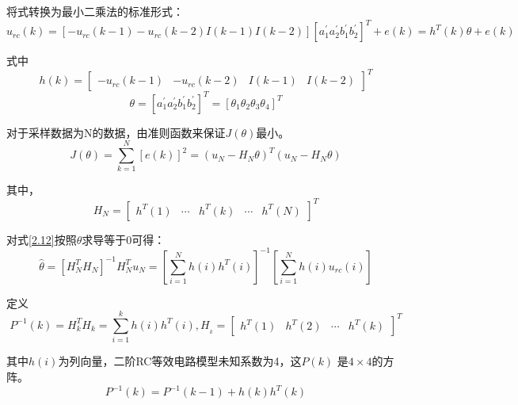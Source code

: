 将式\label{2.7}转换为最小二乘法的标准形式：
\begin{equation}
{{u}_{rc}}(k)=[-{{u}_{rc}}(k-1)-{{u}_{rc}}(k-2)I(k-1)I(k-2)]{{[a_{1}^{'}a_{2}^{'}b_{1}^{'}b_{2}^{'}]}^{T}}+e(k)={{h}^{T}}(k)\theta +e(k)
\end{equation}

式中
\begin{equation}
h(k) = {\left[ {\begin{array}{*{20}{c}}
{ - {u_{rc}}(k - 1)}&{ - {u_{rc}}(k - 2)}&{I(k - 1)}&{I(k - 2)}
\end{array}} \right]^T}
\end{equation}
\begin{equation}
\theta ={{\left[ a_{1}^{'}a_{2}^{'}b_{1}^{'}b_{2}^{'} \right]}^{T}}={{\left[ {{\theta }_{1}}{{\theta }_{2}}{{\theta }_{3}}{{\theta }_{4}} \right]}^{T}}
\end{equation}

对于采样数据为N的数据，由准则函数来保证$J\left( \theta  \right)$最小。
\begin{equation}\label{2.12}
J\left( \theta  \right) = \sum\limits_{k = 1}^N {\left[ {e(k)} \right]_{}^2}  = {\left( {{u_N} - {H_N}\theta } \right)^T}({u_N} - {H_N}\theta )
\end{equation}

其中，
\begin{equation}
{H_N} = {\left[ {\begin{array}{*{20}{c}}
{{h^T}(1)}& \cdots &{{h^T}(k)}& \cdots &{{h^T}(N)}
\end{array}} \right]^T}
\end{equation}

对式\ref{2.12}按照$\theta$求导等于0可得：
\begin{equation}
\widehat \theta  = {\left[ {H_N^T{H_N}} \right]^{ - 1}}H_N^T{u_N} = {\left[ {\sum\limits_{i = 1}^N {h(i){h^T}(i)} } \right]^{ - 1}}\left[ {\sum\limits_{i = 1}^N {h(i){u_{rc}}(i)} } \right]
\end{equation}

定义
\begin{equation}
{P^{ - 1}}(k) = H_k^T{H_k} = {\sum\limits_{i = 1}^k {h(i){h^T}(i),{H_{_k}} = \left[ {\begin{array}{*{20}{c}}
{{h^T}(1)}&{{h^T}(2)}& \cdots &{{h^T}(k)}
\end{array}} \right]} ^T}
\end{equation}

其中$h\left( i \right)$为列向量，二阶RC等效电路模型未知系数为4，这$P\left( k \right)$ 是$4 \times 4$的方阵。
\begin{equation}
{P^{ - 1}}(k) = {P^{ - 1}}(k - 1) + h(k){h^T}(k)
\end{equation}

